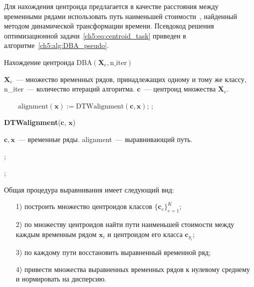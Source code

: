 \documentclass[11pt, a5paper]{dissert}
\begin{document}
Для нахождения центроида предлагается в качестве расстояния между временными рядами использовать путь наименьшей стоимости~\cite{berndt1994using,muller2007dynamic}, найденный методом динамической трансформации времени.
Псевдокод решения оптимизационной задачи~\eqref{ch5:eq:centroid_task} приведен в алгоритме~\ref{ch5:alg:DBA_pseudo}.
\begin{algorithm}[!t]
	\caption{Нахождение центроида $\text{DBA}(\mathbf{X}_e, \text{n\_iter})$}
	\label{ch5:alg:DBA_pseudo}
	\begin{algorithmic}[1]
		\REQUIRE $\mathbf{X}_e$~--- множество временных рядов, принадлежащих одному и тому же классу, n\_iter~--- количество итераций алгоритма.
		\ENSURE $\mathbf{c}$~--- центроид множества $\mathbf{X}_e$.
		
		\STATEx $ \quad \quad \text{alignment}(\mathbf{x}) := \text{DTWalignment}(\mathbf{c}, \mathbf{x})$;
		\ENDFOR
		;
		\ENDFOR
	\end{algorithmic}

	\textbf{DTWalignment}($\mathbf{c}$, $\mathbf{x}$)
	\begin{algorithmic}[1]
		\REQUIRE $\mathbf{c}, \mathbf{x}$~--- временные ряды.
		\ENSURE alignment~--- выравнивающий путь.
		
		;
		
		;
	\end{algorithmic}
\end{algorithm}
Общая процедура выравнивания имеет следующий вид:
\begin{itemize}
	\item[1)]
	построить множество центроидов классов $\{\mathbf{c}_e\}_{e = 1}^K$;
	\item[2)]
	по множеству центроидов найти пути наименьшей стоимости между каждым
	временным рядом $\mathbf{x}_i$ и центроидом его класса $\mathbf{c}_{y_i}$;
	\item[3)]
	по каждому пути восстановить выравненный временной ряд;
	\item[4)]
	привести множества выравненных временных рядов к нулевому среднему и нормировать на дисперсию.
\end{itemize}
\end{document}
